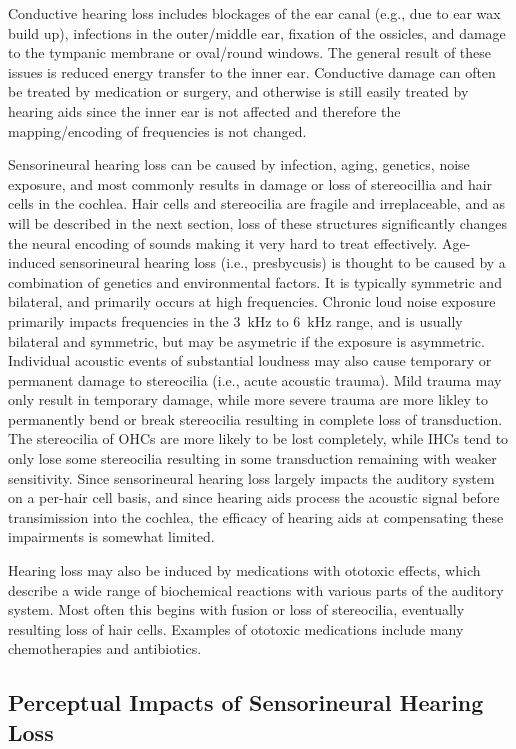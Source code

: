 Conductive hearing loss includes blockages of the ear canal (e.g., due to ear wax build up), infections in the outer/middle ear, fixation of the ossicles, and damage to the tympanic membrane or oval/round windows. The general result of these issues is reduced energy transfer to the inner ear. Conductive damage can often be treated by medication or surgery, and otherwise is still easily treated by hearing aids since the inner ear is not affected and therefore the mapping/encoding of frequencies is not changed.

Sensorineural hearing loss can be caused by infection, aging, genetics, noise exposure, and most commonly results in damage or loss of stereocillia and hair cells in the cochlea. Hair cells and stereocilia are fragile and irreplaceable, and as will be described in the next section, loss of these structures significantly changes the neural encoding of sounds making it very hard to treat effectively. Age-induced sensorineural hearing loss (i.e., presbycusis) is thought to be caused by a combination of genetics and environmental factors. It is typically symmetric and bilateral, and primarily occurs at high frequencies. Chronic loud noise exposure primarily impacts frequencies in the \qty{3}{\kilo\hertz} to \qty{6}{\kilo\hertz} range, and is usually bilateral and symmetric, but may be asymetric if the exposure is asymmetric. Individual acoustic events of substantial loudness may also cause temporary or permanent damage to stereocilia (i.e., acute acoustic trauma). Mild trauma may only result in temporary damage, while more severe trauma are more likley to permanently bend or break stereocilia resulting in complete loss of transduction. The stereocilia of OHCs are more likely to be lost completely, while IHCs tend to only lose some stereocilia resulting in some transduction remaining with weaker sensitivity. Since sensorineural hearing loss largely impacts the auditory system on a per-hair cell basis, and since hearing aids process the acoustic signal before transimission into the cochlea, the efficacy of hearing aids at compensating these impairments is somewhat limited.

Hearing loss may also be induced by medications with ototoxic effects, which describe a wide range of biochemical reactions with various parts of the auditory system. Most often this begins with fusion or loss of stereocilia, eventually resulting loss of hair cells. Examples of ototoxic medications include many chemotherapies and antibiotics.

\subsection{Perceptual Impacts of Sensorineural Hearing Loss} \label{section:hearing_loss_impacts}

